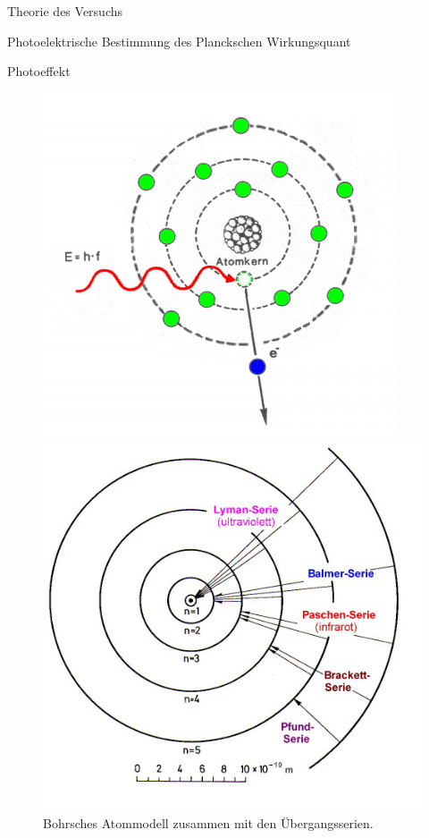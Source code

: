 \documentclass[pdftex, a4paper,11pt, twoside, ngerman]{report}
\begin{document}
\begin{chapter}{Theorie des Versuchs}
\begin{section}{Photoelektrische Bestimmung des Planckschen Wirkungsquant}
\begin{subsection}{Photoeffekt}
        \begin{figure}[htbp]
          \centering
          \begin{minipage}{0.48\textwidth}
            \centering
            \includegraphics[width=.9\textwidth]{Figures/photoeffekt.png}
            \caption{Schematische Darstellung der Wirkungsweise des 
                Photoeffekts.\cite{bib:Photoeffekt}}
            \label{fig:Photoeffekt}
          \end{minipage}\quad
          \begin{minipage}{0.48\textwidth}
            \centering
            \includegraphics[width=.9\textwidth]
                {Figures/BohrschesAtommodellSerien.png}
            \caption{Bohrsches Atommodell zusammen mit den Übergangsserien.
                \cite{bib:BohrschesAtommodellSerien}}
            \label{fig:BohrschesAtommodellSerien}
          \end{minipage}
        \end{figure}
        

\end{subsection}
\end{section}
\end{chapter}
\end{document}
